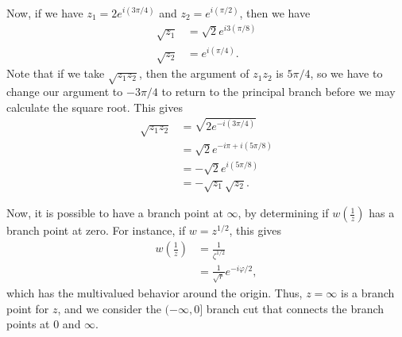 \documentclass[10pt]{mypackage}
\begin{document}
\begin{example}
  Now, if we have $z_1 = 2e^{i\left( 3\pi/4 \right)}$ and $z_2 = e^{i\left( \pi/2 \right)}$, then we have
  \begin{align*}
    \sqrt{z_1} &= \sqrt{2}e^{i3\left( \pi/8 \right)}\\
    \sqrt{z_2} &= e^{i\left( \pi/4 \right)}.
  \end{align*}
  Note that if we take $\sqrt{z_1z_2}$, then the argument of $z_1z_2$ is $5\pi/4$, so we have to change our argument to $-3\pi/4$ to return to the principal branch before we may calculate the square root. This gives
  \begin{align*}
    \sqrt{z_1z_2} &= \sqrt{2e^{-i\left( 3\pi/4 \right)}}\\
                  &= \sqrt{2}e^{-i\pi + i\left( 5\pi/8 \right)}\\
                  &= -\sqrt{2}e^{i\left( 5\pi/8 \right)}\\
                  &= -\sqrt{z_1}\sqrt{z_2}.
  \end{align*}
\end{example}
Now, it is possible to have a branch point at $\infty$, by determining if $w\left( \frac{1}{z} \right)$ has a branch point at zero. For instance, if $w = z^{1/2}$, this gives
\begin{align*}
  w\left( \frac{1}{z} \right) &= \frac{1}{\zeta^{1/2}}\\
                              &= \frac{1}{\sqrt{r}} e^{-i\varphi/2},
\end{align*}
which has the multivalued behavior around the origin. Thus, $z = \infty$ is a branch point for $z$, and we consider the $(-\infty,0]$ branch cut that connects the branch points at $0$ and $\infty$.
\end{document}
